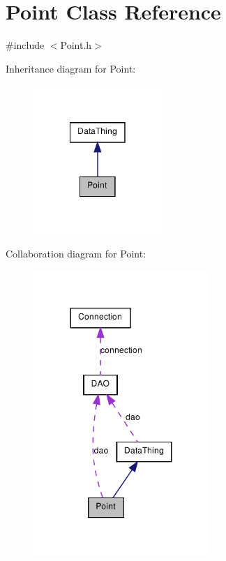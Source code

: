 \hypertarget{class_point}{
\section{Point Class Reference}
\label{class_point}
}


{\ttfamily \#include $<$Point.h$>$}



Inheritance diagram for Point:\nopagebreak
\begin{figure}[H]
\begin{center}
\leavevmode
\includegraphics[width=138pt]{class_point__inherit__graph}
\end{center}
\end{figure}


Collaboration diagram for Point:\nopagebreak
\begin{figure}[H]
\begin{center}
\leavevmode
\includegraphics[width=188pt]{class_point__coll__graph}
\end{center}
\end{figure}
